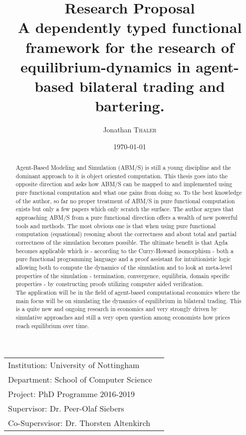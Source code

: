 \documentclass{article}
\title{ {\normalsize Research Proposal} \\ A dependently typed functional framework for the research of equilibrium-dynamics in agent-based bilateral trading and bartering.} %
\author{Jonathan \textsc{Thaler}} %
\date{\today} %
\begin{document}
\maketitle %

\begin{center}
\begin{tabular}{l r}
Institution: University of Nottingham \\
Department: School of Computer Science \\
Project: PhD Programme 2016-2019 \\
Supervisor: Dr. Peer-Olaf Siebers \\
Co-Supersvisor: Dr. Thorsten Altenkirch 
\end{tabular}
\end{center}

\begin{abstract}
Agent-Based Modeling and Simulation (ABM/S) is still a young discipline and the dominant approach to it is object oriented computation. This thesis goes into the opposite direction and asks how ABM/S can be mapped to and implemented using pure functional computation and what one gains from doing so. To the best knowledge of the author, so far no proper treatment of ABM/S in pure functional computation exists but only a few papers which only scratch the surface. The author argues that approaching ABM/S from a pure functional direction  offers a wealth of new powerful tools and methods. The most obvious one is that when using pure functional computation (equational) resoning about the correctness and about total and partial correctness of the simulation becomes possible. The ultimate benefit is that Agda becomes applicable which is - according to the Curry-Howard isomorphism - both a pure functional programming language and a proof assistant for intuitionistic logic allowing both to compute the dynamics of the simulation and to look at meta-level properties of the simulation - termination, convergence, equilibria, domain specific properties - by constructing proofs utilizing computer aided verification. \\
The application will be in the field of agent-based computational economics where the main focus will be on simulating the dynamics of equilibrium in bilateral trading. This is a quite new and ongoing research in economics and very strongly driven by simulative approaches and still a very open question among economists how prices reach equilibrium over time.
\end{abstract}
\end{document}
